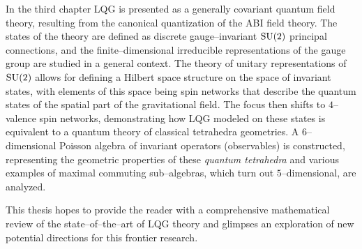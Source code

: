 In the third chapter LQG is presented as a generally covariant quantum field theory, resulting from the canonical quantization of the ABI field theory. The states of the theory are defined as discrete gauge--invariant $\text{\normalfont SU}(2)$ principal connections, and the finite--dimensional irreducible representations of the gauge group are studied in a general context. The theory of unitary representations of $\text{\normalfont SU}(2)$ allows for defining a Hilbert space structure on the space of invariant states, with elements of this space being spin networks that describe the quantum states of the spatial part of the gravitational field. The focus then shifts to $4$--valence spin networks, demonstrating how LQG modeled on these states is equivalent to a quantum theory of classical tetrahedra geometries. A $6$--dimensional Poisson algebra of invariant operators (observables) is constructed, representing the geometric properties of these \emph{quantum tetrahedra} and various examples of maximal commuting sub--algebras, which turn out $5$--dimensional, are analyzed. 

This thesis hopes to provide the reader with a comprehensive mathematical review of the state--of--the--art of LQG theory and glimpses an exploration of new potential directions for this frontier research.\\




